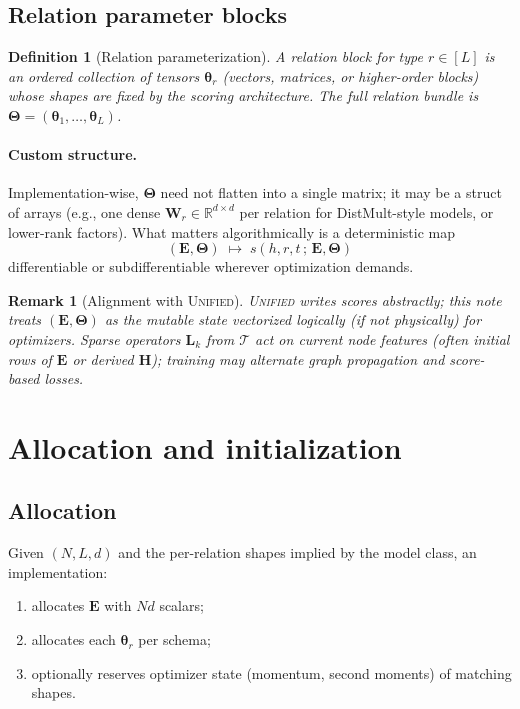 \documentclass[11pt]{article}
\newtheorem{definition}{Definition}
\newtheorem{remark}{Remark}
\begin{document}
\subsection{Relation parameter blocks}
\begin{definition}[Relation parameterization]
A \emph{relation block} for type $r \in [L]$ is an ordered collection of tensors $\bm{\theta}_r$ (vectors, matrices, or higher-order blocks) whose shapes are fixed by the scoring architecture.
The full \emph{relation bundle} is $\bm{\Theta} = (\bm{\theta}_1,\ldots,\bm{\theta}_L)$.
\end{definition}

\paragraph{Custom structure.}
Implementation-wise, $\bm{\Theta}$ need not flatten into a single matrix; it may be a struct of arrays (e.g., one dense $\bm{W}_r \in \mathbb{R}^{d \times d}$ per relation for DistMult-style models, or lower-rank factors).
What matters algorithmically is a deterministic map
\[
  (\bm{E}, \bm{\Theta}) \;\mapsto\; s(h,r,t \,;\, \bm{E}, \bm{\Theta})
\]
differentiable or subdifferentiable wherever optimization demands.

\begin{remark}[Alignment with \textsc{Unified}]
\textsc{Unified} writes scores abstractly; this note treats $(\bm{E}, \bm{\Theta})$ as the mutable state vectorized logically (if not physically) for optimizers.
Sparse operators $\bm{L}_k$ from $\mathcal{T}$ act on \emph{current} node features (often initial rows of $\bm{E}$ or derived $\bm{H}$); training may alternate graph propagation and score-based losses.
\end{remark}

\section{Allocation and initialization}

\subsection{Allocation}
Given $(N, L, d)$ and the per-relation shapes implied by the model class, an implementation:
\begin{enumerate}
  \item allocates $\bm{E}$ with $Nd$ scalars;
  \item allocates each $\bm{\theta}_r$ per schema;
  \item optionally reserves optimizer state (momentum, second moments) of matching shapes.
\end{enumerate}
\end{document}
